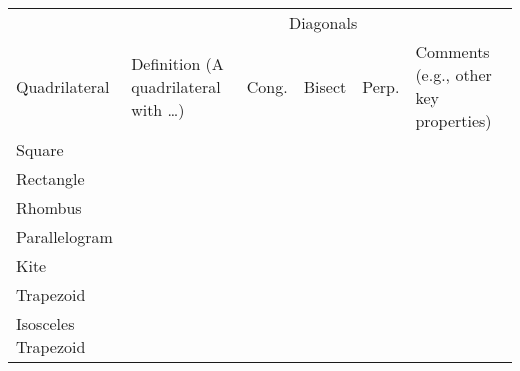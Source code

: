 {
\renewcommand\arraystretch{2.8}
\renewcommand\tabcolsep{12pt}
\begin{table}[h]
\begin{tabular}{|l|p{6cm}|c|c|c|p{8cm}|}
\hline 
 &   & \multicolumn{3}{c|}{Diagonals} &  \\  %
Quadrilateral & Definition (A quadrilateral with \dots) & \begin{sideways}Cong.\end{sideways} & 
\begin{sideways}Bisect\end{sideways} & \begin{sideways}Perp.\end{sideways} & Comments (e.g., other key properties) \\ \hline\hline
Square           &            &   &  &         &                  \\  \hline
Rectangle       &           &   &  &         &                  \\ \hline
Rhombus        &           &   &  &         &                  \\ \hline
Parallelogram &           &   &  &         &                  \\ \hline
Kite                &           &   &  &          &                  \\ \hline
Trapezoid       &           &   &  &         &                  \\ \hline
Isosceles Trapezoid       &           &   &  &         &                  \\ \hline
\end{tabular}
\end{table}
}




